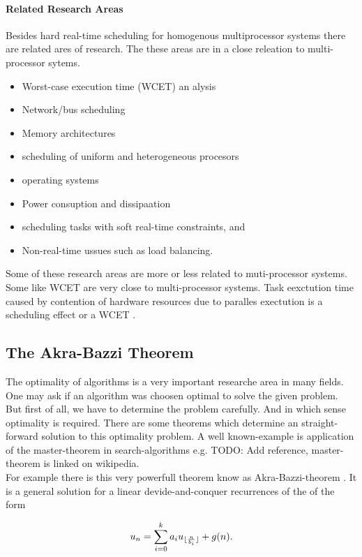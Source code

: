 \paragraph{Related Research Areas}
Besides hard real-time scheduling for homogenous multiprocessor systems there are related ares of research. The these areas are in a  close releation to multi-processor sytems.
\begin{itemize}
\item Worst-case execution time (WCET) an alysis
\item Network/bus scheduling
\item Memory architectures
\item scheduling of uniform and heterogeneous procesors
\item operating systems
\item Power consuption and dissipaation
\item scheduling tasks with soft real-time constraints, and
\item Non-real-time ussues such as load balancing.
\end{itemize}
Some of these research areas are more or less related to muti-processor systems. Some like WCET are very close to multi-processor systems.
Task eexctution time caused by contention of hardware resources due to paralles exectution is a scheduling effect or a WCET \cite[Sec. 10.2]{DB2011}.
 
\subsection{The Akra-Bazzi Theorem}
\label{subsection:The Akra-Bazzi Theorem}
The optimality of algorithms is a very important researche area in many fields.
One may ask if an algorithm was choosen optimal to solve the given problem.
But first of all, we have to determine the problem carefully. And in which sense optimality is required. There are some theorems which determine an straight-forward solution to this optimality problem. A well known-example is application of the master-theorem in search-algorithms e.g. \cite {}TODO: Add reference, master-theorem is linked on wikipedia.\\
For example there is this very powerfull theorem know as Akra-Bazzi-theorem \cite{AB98}.
It is a general solution for a linear devide-and-conquer recurrences of the of the form

 \begin{equation}
 \label{eq:linearDevideAndConquerRecurrence}
 u_n = \sum_{i=0}^k a_i u _{\lfloor\frac{n}{b_i}\rfloor} + g(n).
 \end{equation}
 
